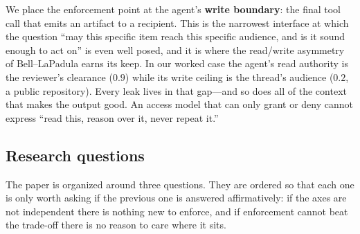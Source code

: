 We place the enforcement point at the agent's \textbf{write boundary}: the
final tool call that emits an artifact to a recipient. This is the narrowest
interface at which the question ``may this specific item reach this specific
audience, and is it sound enough to act on'' is even well posed, and it is
where the read/write asymmetry of Bell--LaPadula earns its keep. In our worked
case the agent's read authority is the reviewer's clearance ($0.9$) while its
write ceiling is the thread's audience ($0.2$, a public repository). Every leak
lives in that gap---and so does all of the context that makes the output good.
An access model that can only grant or deny cannot express ``read this, reason
over it, never repeat it.''

\subsection{Research questions}
\label{sec:intro:rqs}

The paper is organized around three questions. They are ordered so that each
one is only worth asking if the previous one is answered affirmatively: if the
axes are not independent there is nothing new to enforce, and if enforcement
cannot beat the trade-off there is no reason to care where it sits.

